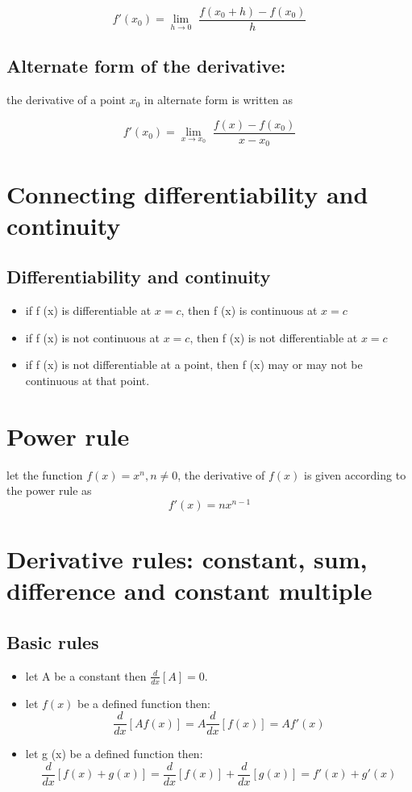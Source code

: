 \documentclass{article}
\begin{document}
   \large \[f'(x_0) = \lim_{h\to0}\hspace{4pt}\frac{f(x_0 + h) - f(x_0)}{h}\]

\subsection{Alternate form of the derivative: }
    the derivative of a point \(x_0\) in alternate form is written as
    
    \large \[f'(x_0) = \lim_{x\to x_0}\hspace{4pt}\frac{f(x) - f(x_0)}{x - x_0}\]
\section{Connecting differentiability and continuity}
\subsection{Differentiability and continuity}
    \begin{itemize}
        \item if f (x) is differentiable at \(x = c\), then f (x) is continuous at \(x = c\)
        \item if f (x) is not continuous at \(x = c\), then f (x) is not differentiable at \(x = c\)
        \item if f (x) is not differentiable at a point, then f (x) may or may not be continuous at that point.
    \end{itemize}
\section{Power rule}
    let the function \large \(f(x) = x ^ n, n\neq 0\), the derivative of \(f(x)\) is given according to the power rule as \large \[f'(x) = nx^{n-1}\]
\section{Derivative rules: constant, sum, difference and constant multiple}
\subsection{Basic rules}
    \begin{itemize}
        \item let A be a constant then \(\frac{d}{dx}[A] = 0\).
        \item let \(f(x)\) be a defined function then: \[\frac{d}{dx}[Af(x)] = A\frac{d}{dx}[f(x)] = Af'(x)\]
        \item let g (x) be a defined function then: \[\frac{d}{dx}[f(x) + g(x)] = \frac{d}{dx}[f(x)] + \frac{d}{dx}[g(x)] = f'(x) + g'(x)\]
    \end{itemize}
\end{document}
